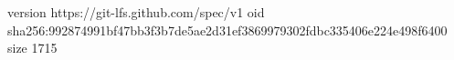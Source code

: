 version https://git-lfs.github.com/spec/v1
oid sha256:992874991bf47bb3f3b7de5ae2d31ef3869979302fdbc335406e224e498f6400
size 1715
